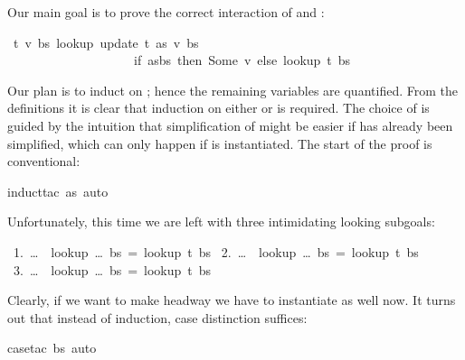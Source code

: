 \begin{isabellebody}
\begin{isamarkuptext}
Our main goal is to prove the correct interaction of  and
:%
\end{isamarkuptext}%
\isamarkuptrue%
\isamarkupfalse%
\ {}{}t\ v\ bs{}\ lookup\ {}update\ t\ as\ v{}\ bs\ {}\isanewline
\ \ \ \ \ \ \ \ \ \ \ \ \ \ \ \ \ \ \ \ {}if\ as{}bs\ then\ Some\ v\ else\ lookup\ t\ bs{}{}%
\isadelimproof
%
\endisadelimproof
%
\isatagproof
%
\begin{isamarkuptxt}%
\noindent
Our plan is to induct on ; hence the remaining variables are
quantified. From the definitions it is clear that induction on either
 or  is required. The choice of  is 
guided by the intuition that simplification of  might be easier
if  has already been simplified, which can only happen if
 is instantiated.
The start of the proof is conventional:%
\end{isamarkuptxt}%
\isamarkuptrue%
\isamarkupfalse%
{}induct{}tac\ as{}\ auto{}%
\begin{isamarkuptxt}%
\noindent
Unfortunately, this time we are left with three intimidating looking subgoals:
\begin{isabelle}
~1.~\dots~{\isasymLongrightarrow}~lookup~\dots~bs~=~lookup~t~bs\isanewline
~2.~\dots~{\isasymLongrightarrow}~lookup~\dots~bs~=~lookup~t~bs\isanewline
~3.~\dots~{\isasymLongrightarrow}~lookup~\dots~bs~=~lookup~t~bs
\end{isabelle}
Clearly, if we want to make headway we have to instantiate  as
well now. It turns out that instead of induction, case distinction
suffices:%
\end{isamarkuptxt}%
\isamarkuptrue%
\isamarkupfalse%
{}case{}tac{}{}{}\ bs{}\ auto{}\isanewline
{}\isamarkupfalse%
%
\endisatagproof
{\isafoldproof}%

\end{isabellebody}
